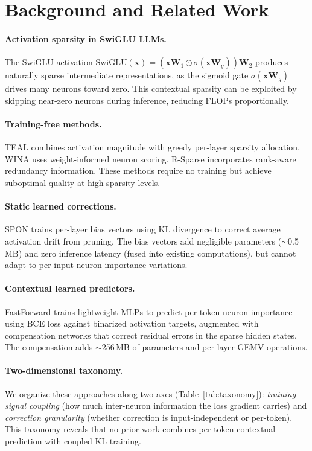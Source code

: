 \documentclass[11pt]{article}
\begin{document}
\section{Background and Related Work}

\paragraph{Activation sparsity in SwiGLU LLMs.}
The SwiGLU activation $\text{SwiGLU}(\mathbf{x}) = (\mathbf{x}\mathbf{W}_1 \odot \sigma(\mathbf{x}\mathbf{W}_g)) \mathbf{W}_2$ produces naturally sparse intermediate representations, as the sigmoid gate $\sigma(\mathbf{x}\mathbf{W}_g)$ drives many neurons toward zero. This contextual sparsity can be exploited by skipping near-zero neurons during inference, reducing FLOPs proportionally.

\paragraph{Training-free methods.}
TEAL combines activation magnitude with greedy per-layer sparsity allocation. WINA uses weight-informed neuron scoring. R-Sparse incorporates rank-aware redundancy information. These methods require no training but achieve suboptimal quality at high sparsity levels.

\paragraph{Static learned corrections.}
SPON trains per-layer bias vectors using KL divergence to correct average activation drift from pruning. The bias vectors add negligible parameters (${\sim}$0.5\,MB) and zero inference latency (fused into existing computations), but cannot adapt to per-input neuron importance variations.

\paragraph{Contextual learned predictors.}
FastForward trains lightweight MLPs to predict per-token neuron importance using BCE loss against binarized activation targets, augmented with compensation networks that correct residual errors in the sparse hidden states. The compensation adds ${\sim}$256\,MB of parameters and per-layer GEMV operations.

\paragraph{Two-dimensional taxonomy.}
We organize these approaches along two axes (Table~\ref{tab:taxonomy}): \emph{training signal coupling} (how much inter-neuron information the loss gradient carries) and \emph{correction granularity} (whether correction is input-independent or per-token). This taxonomy reveals that no prior work combines per-token contextual prediction with coupled KL training.
\end{document}
